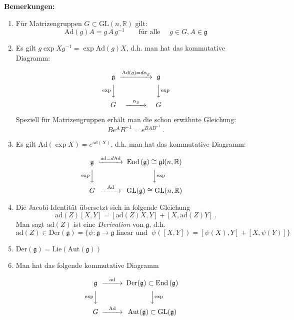 \documentclass[12pt,a4paper]{article}
\def\R{\mathbb{R}}
\def\GL{\mathrm{GL}}
\def\Ad{\mathrm{Ad}}
\def\ad{\mathrm{ad}}
\def\End{\mathrm{End}\,}
\def\Lie{\mathrm{Lie}}
\def\Der{\mathrm{Der}}
\def\g{\mathfrak{g}}
\def\Aut{\mathrm{Aut}}
\def\gl{\mathfrak{gl}}
\def\ad{\mathrm{ad}}
\begin{document}
{\bf Bemerkungen:}
\begin{enumerate}
\item
F\"ur Matrizengruppen $G\subset \GL(n,\R)$ gilt:
$$
\Ad(g)A = g \, A \, g^{-1} \qquad \mbox{f\"ur alle }\quad g\in G, A\in \g
$$
\item
Es gilt $g \exp X g^{-1} = \exp \Ad(g)X$, d.h. man hat das kommutative Diagramm:

\begin{equation*}
\begin{CD}
\mathfrak{g} @> \Ad(g)=d\alpha_g >> \mathfrak{g}\\
@V\exp VV @VV {\exp}V \\
G @>\alpha_g >> G
\end{CD}
\end{equation*}

Speziell f\"ur Matrizengruppen erh\"alt man die schon erw\"ahnte Gleichung:
$$
B e^A B^{-1}= e^{BAB^{-1}} \ .
$$

\item
Es gilt $\Ad(\exp X)= e^{\ad(X)}$, d.h. man hat das kommutative Diagramm:


\begin{equation*}
\begin{CD}
\mathfrak{g} @> \ad =d \Ad >> \End (\g) \cong \gl(n,\R)\\
@V\exp VV @VV {\exp}V \\
G @>\Ad >> \GL(\g) \cong \GL(n,\R)
\end{CD}
\end{equation*}



\item
Die Jacobi-Identit\"at \"ubersetzt sich in folgende Gleichung
$$
\ad(Z)[X,Y] = [\ad(Z)X, Y] + [X,\ad(Z)Y] \ .
$$
Man sagt $\ad(Z)$ ist eine {\it Derivation} von $\g$, d.h.
$$
\ad(Z) \in \Der(\g) = \{\psi : \g \rightarrow \g \; \mbox{linear und } \; \psi([X,Y]) = [\psi(X), Y] + [X,\psi(Y)]  \}
$$
\item
$\Der(\g) = \Lie(\Aut(\g))$
\item
Man hat das folgende kommutative Diagramm

\begin{equation*}
\begin{CD}
\mathfrak{g} @> \ad  >> \Der (\g) \subset \End(\g) \\
@V\exp VV @VV {\exp}V \\
G @>\Ad >> \Aut (\g) \subset \mathrm{GL}(\g)
\end{CD}
\end{equation*}


\end{enumerate}
\end{document}

